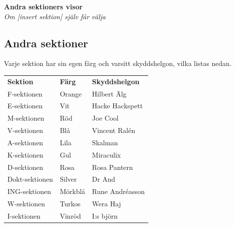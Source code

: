 \begin{center}
    \vspace*{1.5cm}
    {\fontsize{20}{20}\textbf{Andra sektioners visor}}\\
    \vspace{0.7cm}
    {\fontsize{12}{12}\textit{Om [insert sektion] själv får välja}}  
\end{center}
\newpage
\resetBackground

\noBackground
\subsection*{Andra sektioner}

Varje sektion har sin egen färg och varsitt skyddshelgon, vilka listas nedan.

\renewcommand{\arraystretch}{1.3}
\setlength{\tabcolsep}{10pt}

\begin{center}
\begin{tabular}{lll}
\textbf{Sektion} & \textbf{Färg} & \textbf{Skyddshelgon} \\

F-sektionen & Orange & Hilbert Älg \\
E-sektionen & Vit & Hacke Hackspett \\
M-sektionen & Röd & Joe Cool \\
V-sektionen & Blå & Vincent Ralén \\
A-sektionen & Lila & Skalman \\
K-sektionen & Gul & Miraculix \\
D-sektionen & Rosa & Rosa Pantern \\
Dokt-sektionen & Silver & Dr And \\
ING-sektionen & Mörkblå & Rune Andréasson \\
W-sektionen & Turkos & Wera Haj \\
I-sektionen & Vinröd & I:s björn \\
\end{tabular}
\end{center}


